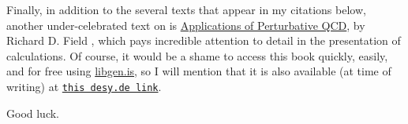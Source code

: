 Finally, in addition to the several texts that appear in my citations below, another under-celebrated text on  is \underline{Applications of Perturbative QCD}, by Richard D. Field \cite{Field:1989uq}, which pays incredible attention to detail in the presentation of calculations.
%
Of course, it would be a shame to access this book quickly, easily, and for free using \url{libgen.is}, so I will mention that it is also available (at time of writing) at \href{https://www.desy.de/~jung/qcd_and_mc_2009-2010/R.Field-Applications-of-pQCD.pdf}{\texttt{this desy.de link}}.

\begin{center}
Good luck.
\end{center}
